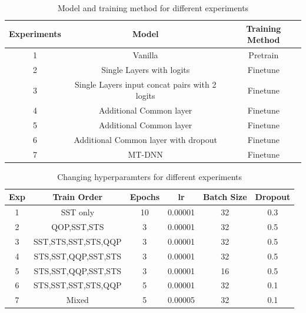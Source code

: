 \documentclass{article}
\begin{document}
\begin{table}[htp]
\centering
\begin{tabular}{|c|c|c|}
\hline
\textbf{Experiments} & \textbf{Model}                                 & \textbf{Training Method} \\ \hline
1                    & Vanilla                                        & Pretrain                 \\ \hline
2                    & Single Layers with logits                      & Finetune                 \\ \hline
3                    & Single Layers input concat pairs with 2 logits & Finetune                 \\ \hline
4                    & Additional Common layer                        & Finetune                 \\ \hline
5                    & Additional Common layer                        & Finetune                 \\ \hline
6                    & Additional Common layer with dropout           & Finetune                 \\ \hline
7                    & MT-DNN                                         & Finetune                 \\ \hline
\end{tabular}
\caption{Model and training method for different experiments}
\label{experiment-models}
\end{table}

\begin{table}[!htbp]
\centering
\begin{tabular}{|c|c|c|c|c|c|}
  \hline
  \textbf{Exp} &
  \textbf{Train Order} &
  \textbf{Epochs} &
  \textbf{lr} &
  \textbf{Batch Size} &
  \textbf{Dropout} \\
  \hline
  1 & SST only & 10 & 0.00001 & 32 & 0.3 \\
  \hline
  2 & QOP,SST,STS & 3 & 0.00001 & 32 & 0.5 \\
  \hline
  3 & SST,STS,SST,STS,QQP & 3 & 0.00001 & 32 & 0.5 \\
  \hline
  4 & STS,SST,QQP,SST,STS & 3 & 0.00001 & 32 & 0.5 \\
  \hline
  5 & STS,SST,QQP,SST,STS & 3 & 0.00001 & 16 & 0.5 \\
  \hline
  6 & STS,SST,SST,STS,QQP & 5 & 0.00001 & 32 & 0.1 \\
  \hline
  7 & Mixed & 5 & 0.00005 & 32 & 0.1 \\
  \hline
\end{tabular}
\caption{Changing hyperparamters for different experiments}
\label{experiment-hyperparameters}
\end{table}
\end{document}
